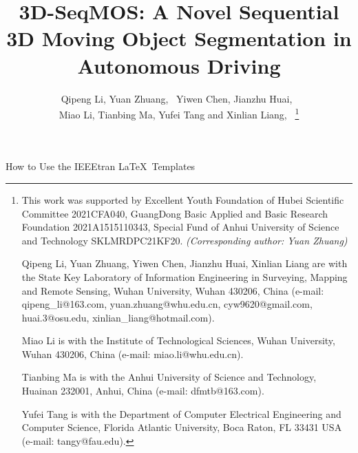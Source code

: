 \documentclass[lettersize,journal]{IEEEtran}
\begin{document}
\title{3D-SeqMOS: A Novel Sequential 3D Moving Object Segmentation in Autonomous Driving}
\author{Qipeng Li, Yuan Zhuang,~ Yiwen Chen, Jianzhu Huai,~ \\
 Miao Li, Tianbing Ma, Yufei Tang and Xinlian Liang,~
\thanks{This work was supported by Excellent Youth Foundation of Hubei Scientific Committee 2021CFA040, GuangDong Basic Applied and Basic Research Foundation 2021A1515110343, Special Fund of Anhui University of Science and Technology SKLMRDPC21KF20. \emph{(Corresponding author: Yuan Zhuang)}

Qipeng Li, Yuan Zhuang, Yiwen Chen, Jianzhu Huai, Xinlian Liang are with the State Key Laboratory of Information Engineering in Surveying, Mapping and Remote Sensing, Wuhan University, Wuhan 430206, China (e-mail: qipeng\_li@163.com, yuan.zhuang@whu.edu.cn, cyw9620@gmail.com, huai.3@osu.edu, xinlian\_liang@hotmail.com). 

Miao Li is with the Institute of Technological Sciences, Wuhan University, Wuhan 430206, China (e-mail: miao.li@whu.edu.cn).

Tianbing Ma is with the Anhui University of Science and Technology, Huainan 232001, Anhui, China (e-mail: dfmtb@163.com).


Yufei Tang is with the Department of Computer Electrical Engineering and Computer Science, Florida Atlantic University, Boca Raton, FL 33431 USA (e-mail: tangy@fau.edu).

}}

\markboth{ }%
{How to Use the IEEEtran \LaTeX \ Templates}

\maketitle
\end{document}
